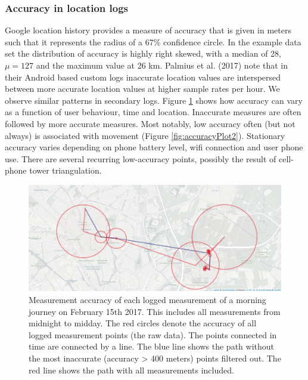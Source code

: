 \documentclass[english,man]{apa6}
\theoremstyle{definition}
\theoremstyle{definition}
\theoremstyle{definition}
\theoremstyle{remark}
\begin{document}
\subsubsection{Accuracy in location
logs}\label{accuracy-in-location-logs}

Google location history provides a measure of accuracy that is given in
meters such that it represents the radius of a 67\% confidence circle.
In the example data set the distribution of accuracy is highly right
skewed, with a median of 28, \(\mu = 127\) and the maximum value at 26
km. Palmius et al. (2017) note that in their Android based custom logs
inaccurate location values are interspersed between more accurate
location values at higher sample rates per hour. We observe similar
patterns in secondary logs. Figure \ref{fig:accuracyPlot} shows how
accuracy can vary as a function of user behaviour, time and location.
Inaccurate measures are often followed by more accurate measures. Most
notably, low accuracy often (but not always) is associated with movement
(Figure \ref{fig:accuracyPlot2}). Stationary accuracy varies depending
on phone battery level, wifi connection and user phone use. There are
several recurring low-accuracy points, possibly the result of cell-phone
tower triangulation.

\begin{figure}
\includegraphics[width=1\linewidth]{img/journeyTillMiddayBoaz} \caption{Measurement accuracy of each logged measurement of a morning journey on February 15th 2017. This includes all measurements from midnight to midday. The red circles denote the accuracy of all logged measurement points (the raw data). The points connected in time are connected by a line. The blue line shows the path without the most inaccurate (accuracy > 400 meters) points filtered out. The red line shows the path with all measurements included. }\label{fig:accuracyPlot}
\end{figure}
\end{document}
